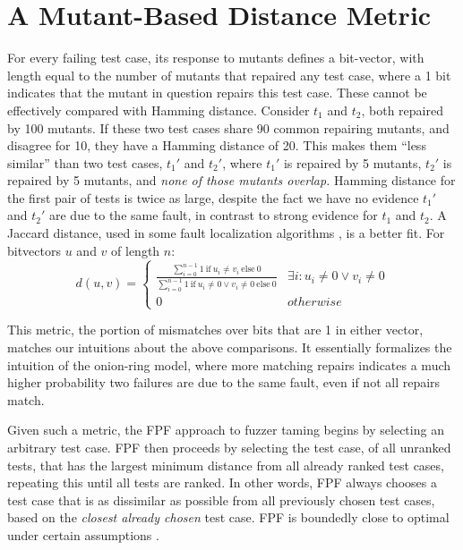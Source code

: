 \section{A Mutant-Based Distance Metric}

For every failing test case, its response to mutants defines a bit-vector, with
length equal to the number of mutants that repaired any test case,
where a 1 bit indicates that the mutant in question repairs this test
case.  These cannot be effectively compared with Hamming distance. Consider $t_1$ and $t_2$, both repaired
by 100 mutants.  If these two test cases share 90 common repairing
mutants, and disagree for 10, they have a Hamming
distance of 20.  This makes them ``less similar'' than two test cases,
$t_1'$ and $t_2'$, where $t_1'$ is repaired by 5 mutants, $t_2'$ is
repaired by 5 mutants, and \emph{none of those mutants overlap.}   Hamming distance for the first pair of tests is twice as
large, despite the fact we have no evidence $t_1'$ and
$t_2'$ are due to the same fault, in contrast to strong evidence for $t_1$ and $t_2$.  A Jaccard distance, used in some fault
localization algorithms \cite{Liu06}, is a better fit.  For bitvectors $u$ and $v$ of length $n$:
\[d(u,v) = 
\begin{cases}
\frac{\sum_{i=0}^{n-1} 1\ \text{if}\ u_i \neq v_i\ \text{else}\ 0}{\sum_{i=0}^{n-1} 1
\  \text{if}\ u_i \neq 0 \vee v_i \neq 0\ \text{else}\ 0} & \exists i:u_i\neq 0 \vee v_i\neq 0\\
0 & otherwise
\end{cases}
\]

This metric, the portion of mismatches over bits that are 1 in either
vector, matches our intuitions about the above comparisons.  It
essentially formalizes the intuition of the onion-ring model, where
more matching repairs indicates a much higher probability two failures
are due to the same fault, even if not all repairs match.

Given such a metric, the FPF \cite{Gonzalez} approach to fuzzer taming \cite{PLDI13}
begins by selecting an arbitrary test case.   FPF then proceeds by selecting the test
case, of all unranked tests, that has the largest minimum distance
from all already ranked test cases, repeating this until all tests are
ranked.  In other words, FPF always chooses a test case that is as dissimilar as
possible from all previously chosen test cases, based on the \emph{closest
already chosen} test case.  FPF is boundedly close
to optimal under certain assumptions \cite{Gonzalez}.

